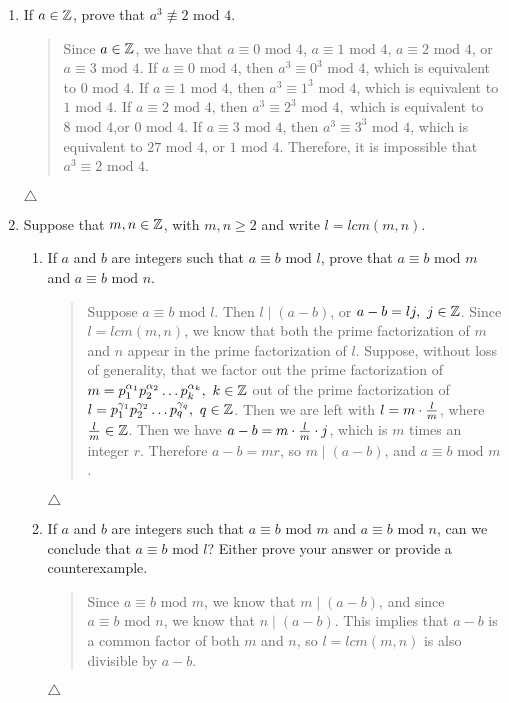 \documentclass{hw}
\begin{document}
\begin{enumerate}
\item If $a\in\mathbb{Z}$, prove that $a^3\not\equiv2\text{ mod }4$.
\begin{quote}
Since $a\in\mathbb{Z}$, we have that $a\equiv0\text{ mod }4$, $a\equiv1\text{ mod }4$, $a\equiv2\text{ mod }4$, or
$a\equiv3\text{ mod }4$.
If $a\equiv0\text{ mod }4$, then $a^3\equiv0^3\text{ mod }4$, which is equivalent to $0\text{ mod }4$.
If $a\equiv1\text{ mod }4$, then $a^3\equiv1^3\text{ mod }4$, which is equivalent to $1\text{ mod }4$.
If $a\equiv2\text{ mod }4$, then $a^3\equiv2^3\text{ mod }4,$ which is equivalent to
$8\text{ mod }4$,or $0\text{ mod }4$.
If $a\equiv3\text{ mod }4$, then $a^3\equiv3^3\text{ mod }4$, which is equivalent to
$27\text{ mod }4$, or $1\text{ mod }4$.
Therefore, it is impossible that $a^3\equiv2\text{ mod }4$.
\end{quote}
$\triangle$

\item Suppose that $m,n\in\mathbb{Z}$, with $m,n\geq2$ and write $l=lcm(m,n)$.
\begin{enumerate}
\item If $a$ and $b$ are integers such that $a\equiv b\text{ mod }l$, prove that
$a\equiv b\text{ mod }m$ and $a\equiv b\text{ mod }n$.
\begin{quote}
Suppose $a\equiv b\text{ mod }l$. Then $l\mid(a-b)$, or $a-b=lj,\ j\in\mathbb{Z}$. Since $l=lcm(m,n)$, we know that
both the prime factorization of $m$ and $n$ appear in the prime factorization of $l$. Suppose, without loss
of generality, that we factor out the prime factorization of
$m=p_{1}^{\alpha_{1}}p_{2}^{\alpha_{2}}\dots p_{k}^{\alpha_{k}},\ k\in\mathbb{Z}$ out of the prime factorization of
$l = p_{1}^{\gamma_{1}}p_{2}^{\gamma_{2}}\dots p_{q}^{\gamma_{q}},\ q\in\mathbb{Z}$. Then we are left with
$l=m\cdot{l\over m}$, where ${l\over m}\in\mathbb{Z}$. Then we have $a-b=m\cdot{l\over m}\cdot j$, which is $m$
times an integer $r$. Therefore $a-b=mr$, so $m\mid(a-b)$, and $a\equiv b\text{ mod }m$.
\end{quote}
$\triangle$

\item If $a$ and $b$ are integers such that $a\equiv b\text{ mod }m$ and $a\equiv b\text{ mod }n$, can
we conclude that $a\equiv b\text{ mod }l$? Either prove your answer or provide a counterexample.
\begin{quote}
Since $a\equiv b\text{ mod }m$, we know that $m\mid (a-b)$, and since $a\equiv b\text{ mod }n$, we know
that $n\mid (a-b)$. This implies that $a-b$ is a common factor of both $m$ and $n$, so $l=lcm(m,n)$ is
also divisible by $a-b$.
\end{quote}
$\triangle$
\end{enumerate}


\end{enumerate}
\end{document}
